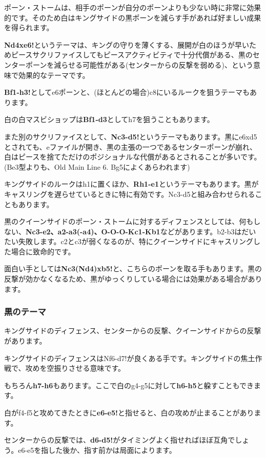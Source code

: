 ポーン・ストームは、相手のポーンが自分のポーンよりも少ない時に非常に効果的です。そのため白はキングサイドの黒ポーンを減らす手があれば好ましい成果を得られます。

{\bf Nd4xe6!}というテーマは、キングの守りを薄くする、展開が白のほうが早いためピースサクリファイスしてもピースアクティビティで十分代償がある、黒のセンターポーンを減らせる可能性がある(センターからの反撃を弱める)、という意味で効果的なテーマです。

{\bf Bf1-h3!}としてe6ポーンと、(ほとんどの場合)c8にいるルークを狙うテーマもあります。

白の白マスビショップは{\bf Bf1-d3}としてh7を狙うこともあります。

また別のサクリファイスとして、{\bf Nc3-d5!}というテーマもあります。黒にe6xd5とされても、eファイルが開き、黒の主張の一つであるセンターポーンが崩れ、白はピースを捨てただけのポジショナルな代償があるとされることが多いです。(Be3型よりも、Old Main Line 6. Bg5によくあらわれます)

キングサイドのルークはh1に置くほか、{\bf Rh1-e1}というテーマもあります。黒がキャスリングを遅らせているときに特に有効です。Nc3-d5と組み合わせられることもあります。

黒のクイーンサイドのポーン・ストームに対するディフェンスとしては、何もしない、{\bf Nc3-e2、a2-a3(-a4)、O-O-O-Kc1-Kb1}などがあります。b2-b3はだいたい失敗します。c2とc3が弱くなるのが、特にクイーンサイドにキャスリングした場合に致命的です。

面白い手としては{\bf Nc3(Nd4)xb5!}と、こちらのポーンを取る手もあります。黒の反撃が効かなくなるため、黒がゆっくりしている場合には効果がある場合があります。

\subsubsection{黒のテーマ}

キングサイドのディフェンス、センターからの反撃、クイーンサイドからの反撃があります。

キングサイドのディフェンスはNf6-d7!が良くある手です。キングサイドの焦土作戦で、攻めを空振りさせる意味です。

もちろん{\bf h7-h6}もあります。ここで白のg4-g5に対して{\bf h6-h5}と躱すこともできます。

白がf4-f5と攻めてきたときに{\bf e6-e5!}と指せると、白の攻めが止まることがあります。

センターからの反撃では、{\bf d6-d5!}がタイミングよく指せればほぼ互角でしょう。e6-e5を指した後か、指す前かは局面によります。

